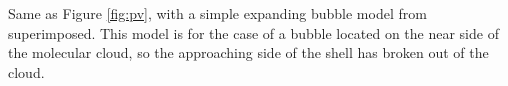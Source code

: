 \label{fig:pv_model} Same as Figure \ref{fig:pv}, with a simple expanding bubble model from \citet{Arce_2011} superimposed. This model is for the case of a bubble located on the near side of the molecular cloud, so the approaching side of the shell has broken out of the cloud.